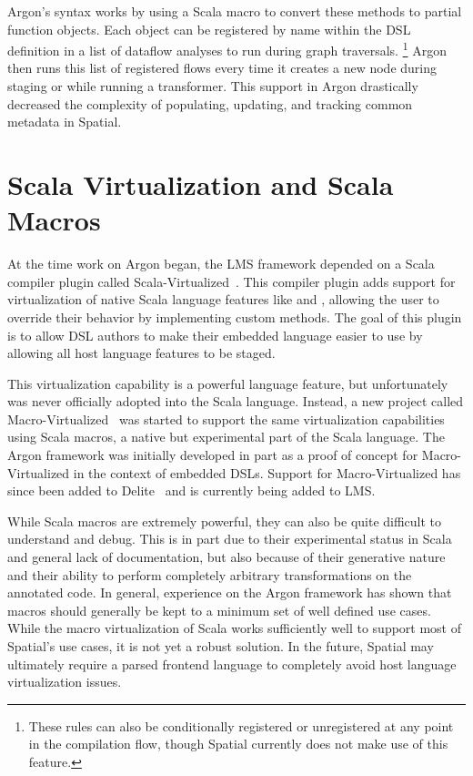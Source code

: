 Argon's  syntax works by using a Scala macro to convert these methods
to partial function objects. Each object can be registered by name within the DSL definition
in a list of dataflow analyses to run during graph traversals.
\footnote{These rules can also be conditionally registered or unregistered at any point
in the compilation flow, though Spatial currently does not make use of this feature.}
Argon then runs this list of registered flows every time it creates a new node during
staging or while running a transformer. This support in Argon drastically decreased
the complexity of populating, updating, and tracking common metadata in Spatial.


\section{Scala Virtualization and Scala Macros}
At the time work on Argon began, the LMS framework depended on a Scala compiler plugin called Scala-Virtualized~\cite{scala-virtualized}. This compiler plugin adds support for
virtualization of native Scala language features like  and ,
allowing the user to override their behavior by implementing custom methods.
The goal of this plugin is to allow DSL authors to make their embedded language easier to use
by allowing all host language features to be staged.

This virtualization capability is a powerful language feature, but unfortunately was never
officially adopted into the Scala language.
Instead, a new project called Macro-Virtualized~\cite{macro-virtualized} was started to support the same virtualization
capabilities using Scala macros, a native but experimental part of the Scala language.
The Argon framework was initially developed in part as a proof of concept for
Macro-Virtualized in the context of embedded DSLs. Support for Macro-Virtualized has since been
added to Delite~\cite{cedric-thesis, boris-thesis} and is currently being added to LMS.

While Scala macros are extremely powerful, they can also be quite difficult to understand
and debug. This is in part due to their experimental status in Scala and general lack
of documentation, but also because of their generative nature and their ability to perform
completely arbitrary transformations on the annotated code. In general, experience on the
Argon framework has shown that macros should generally be kept to a minimum set of
well defined use cases. While the macro virtualization of Scala works sufficiently well
to support most of Spatial's use cases, it is not yet a robust solution.
In the future, Spatial may ultimately require a parsed frontend
language to completely avoid host language virtualization issues.

